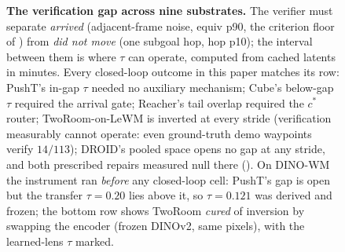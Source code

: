 \begin{figure}[t]
\caption{\textbf{The verification gap across nine substrates.} The verifier must
separate \emph{arrived} (adjacent-frame noise, equiv p90, the criterion floor of
) from \emph{did not move} (one subgoal hop, hop p10); the
interval between them is where $\tau$ can operate, computed from cached latents in
minutes. Every closed-loop outcome in this paper matches its row: PushT's in-gap
$\tau$ needed no auxiliary mechanism; Cube's below-gap $\tau$ required the arrival
gate; Reacher's tail overlap required the $c^{*}$ router; TwoRoom-on-LeWM is
inverted at every stride (verification measurably cannot operate: even ground-truth
demo waypoints verify $14/113$); DROID's pooled space opens no gap at any stride,
and both prescribed repairs measured null there ().
On DINO-WM the instrument ran \emph{before} any closed-loop cell: PushT's gap is
open but the transfer $\tau{=}0.20$ lies above it, so $\tau{=}0.121$ was derived and
frozen; the bottom row shows TwoRoom \emph{cured} of inversion by swapping the
encoder (frozen DINOv2, same pixels), with the learned-lens $\tau$ marked.}
\label{fig:gap}
\end{figure}

